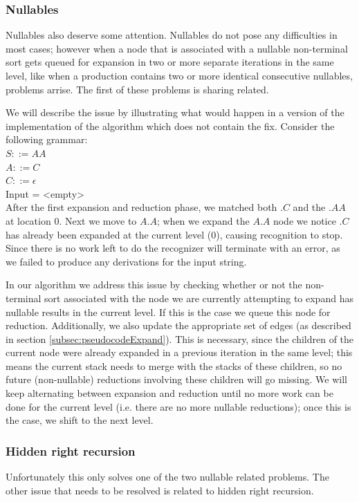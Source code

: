\documentclass[a4paper,10pt]{article}
\begin{document}
\subsubsection{Nullables}
\label{subsec:nullables}
Nullables also deserve some attention. Nullables do not pose any difficulties in most cases; however when a node that is associated with a nullable non-terminal sort gets queued for expansion in two or more separate iterations in the same level, like when a production contains two or more identical consecutive nullables, problems arrise. The first of these problems is sharing related.

We will describe the issue by illustrating what would happen in a version of the implementation of the algorithm which does not contain the fix.
Consider the following grammar:\\
$S ::= AA$\\
$A ::= C$\\
$C ::= \epsilon$\\
Input = <empty>\\
After the first expansion and reduction phase, we matched both $.C$ and the $.AA$ at location $0$. Next we move to $A.A$; when we expand the $A.A$ node we notice $.C$ has already been expanded at the current level ($0$), causing recognition to stop. Since there is no work left to do the recognizer will terminate with an error, as we failed to produce any derivations for the input string.

In our algorithm we address this issue by checking whether or not the non-terminal sort associated with the node we are currently attempting to expand has nullable results in the current level. If this is the case we queue this node for reduction. Additionally, we also update the appropriate set of edges (as described in section \ref{subsec:pseudocodeExpand}). This is necessary, since the children of the current node were already expanded in a previous iteration in the same level; this means the current stack needs to merge with the stacks of these children, so no future (non-nullable) reductions involving these children will go missing. We will keep alternating between expansion and reduction until no more work can be done for the current level (i.e. there are no more nullable reductions); once this is the case, we shift to the next level.

\subsubsection{Hidden right recursion}
\label{subsec:hiddenRightRecursion}
Unfortunately this only solves one of the two nullable related problems. The other issue that needs to be resolved is related to hidden right recursion.
\end{document}
